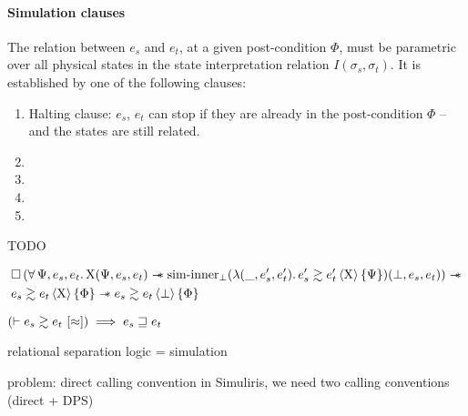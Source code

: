 \clearpage


\paragraph{Simulation clauses} The relation between $e_s$ and $e_t$, at a given post-condition $\Phi$, must be parametric over all physical states in the state interpretation relation $I(\sigma_s, \sigma_t)$. It is established by one of the following clauses:

\begin{enumerate}
\item[\circled{1}] Halting clause: $e_s$, $e_t$ can stop if they are already in the post-condition $\Phi$ -- and the states are still related.
\item[\circled{2}]
\item[\circled{3}]
\item[\circled{4}]
\item[\circled{5}]
\end{enumerate}




TODO

\clearpage

\begin{theorem}
    \begin{align*}
            &
            \iPersistent \left(
                \forall \Psi, e_s, e_t \ldotp
                \Chi (\Psi, e_s, e_t) \iSepImp
                \mathrm{sim \mathhyphen inner}_\bot (\lambdaAbs (\_, e_s', e_t') \ldotp \iSim[\Chi]{\Psi}{e_s'}{e_t'}) (\bot, e_s, e_t)
            \right) \iSepImp
        \\
            &
            \iSim[\Chi]{\Phi}{e_s}{e_t} \iSepImp
            \iSim[\bot]{\Phi}{e_s}{e_t}
    \end{align*}
\end{theorem}

\begin{theorem}[Adequacy]
    $
        \left( \vdash \iSimv{\iSimilar}{e_s}{e_t} \right) \implies
        e_s \refined e_t
    $
\end{theorem}

relational separation logic = simulation

problem: direct calling convention in Simuliris, we need two calling conventions (direct + DPS)

